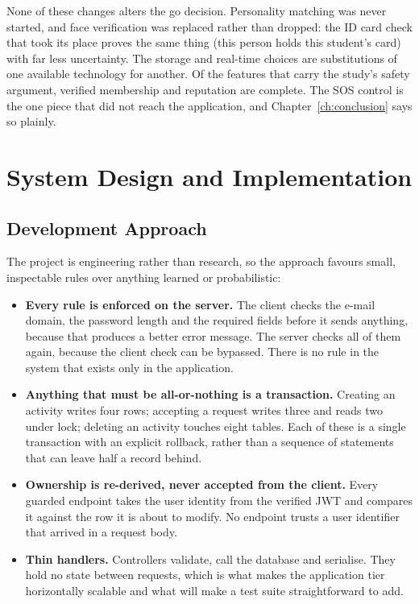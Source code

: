 \documentclass{tietreport}
\begin{document}
None of these changes alters the go decision. Personality matching was never started,
and face verification was replaced rather than dropped: the ID card check that took its
place proves the same thing (this person holds this student's card) with far less
uncertainty. The storage and real-time choices are substitutions of one available
technology for another. Of the features that carry the study's safety argument,
verified membership and reputation are complete. The SOS control is the one piece that
did not reach the application, and Chapter~\ref{ch:conclusion} says so plainly.



\chapter{System Design and Implementation}
\label{ch:design}

\section{Development Approach}

The project is engineering rather than research, so the approach favours small,
inspectable rules over anything learned or probabilistic:

\begin{itemize}
  \item \textbf{Every rule is enforced on the server.} The client checks the e-mail
        domain, the password length and the required fields before it sends anything,
        because that produces a better error message. The server checks all of them
        again, because the client check can be bypassed. There is no rule in the system
        that exists only in the application.

  \item \textbf{Anything that must be all-or-nothing is a transaction.} Creating an
        activity writes four rows; accepting a request writes three and reads two under
        lock; deleting an activity touches eight tables. Each of these is a single
        transaction with an explicit rollback, rather than a sequence of statements that
        can leave half a record behind.

  \item \textbf{Ownership is re-derived, never accepted from the client.} Every guarded
        endpoint takes the user identity from the verified JWT and compares it against
        the row it is about to modify. No endpoint trusts a user identifier that arrived
        in a request body.

  \item \textbf{Thin handlers.} Controllers validate, call the database and serialise.
        They hold no state between requests, which is what makes the application tier
        horizontally scalable and what will make a test suite straightforward to add.
\end{itemize}
\end{document}
